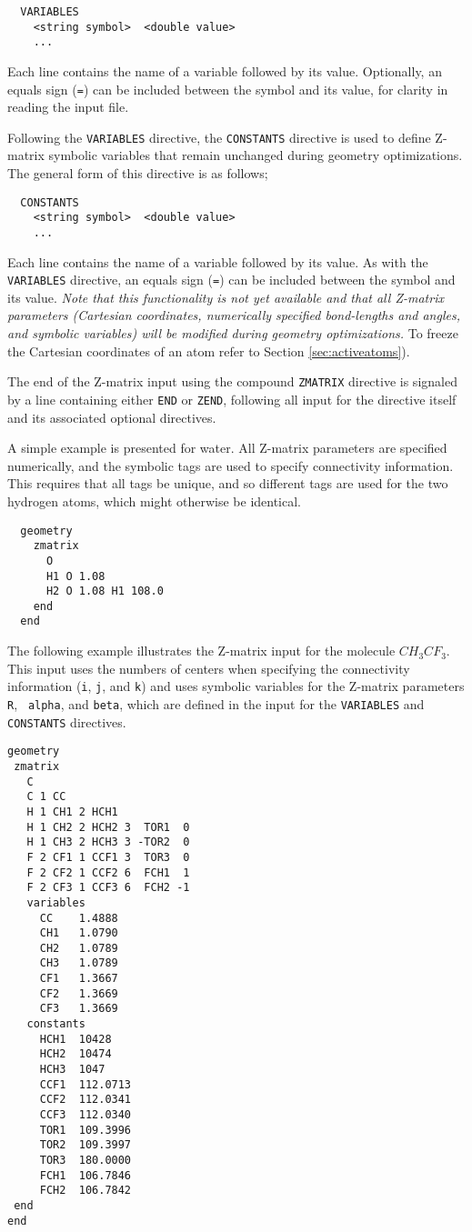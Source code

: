 \begin{verbatim}
  VARIABLES
    <string symbol>  <double value>
    ...
\end{verbatim}
Each line contains the name of a variable followed by its value.
Optionally, an equals sign (\verb+=+) can be included between the
symbol and its value, for clarity in reading the input file.

Following the \verb+VARIABLES+ directive, the \verb+CONSTANTS+
directive is used to define Z-matrix symbolic 
variables that remain unchanged during geometry optimizations.  The
general form of this directive is as follows;
\begin{verbatim}
  CONSTANTS
    <string symbol>  <double value>
    ...
\end{verbatim}
Each line contains the name of a variable followed by its value.
As with the \verb+VARIABLES+ directive, 
an equals sign (\verb+=+) can be included between the
symbol and its value.
{\em Note that this functionality is not yet available and that all
  Z-matrix parameters (Cartesian coordinates, numerically specified
  bond-lengths and angles, and symbolic variables) will be modified
  during geometry optimizations.}  To freeze the Cartesian coordinates
of an atom refer to Section \ref{sec:activeatoms}).

The end of the Z-matrix input using the compound \verb+ZMATRIX+
directive is signaled by a line containing either \verb+END+ or
\verb+ZEND+, following all input for the directive itself and its
associated optional directives.  

A simple example is presented for water.  All Z-matrix parameters are
specified numerically, and the symbolic tags are used to specify
connectivity information.  This requires that all tags be unique, and
so different tags are used for the two hydrogen atoms, which might 
otherwise be identical.
\begin{verbatim}
  geometry
    zmatrix 
      O
      H1 O 1.08
      H2 O 1.08 H1 108.0
    end
  end
\end{verbatim}

The following example illustrates the Z-matrix input for the molecule
$CH_3CF_3$.  This input uses the numbers of centers when specifying
the connectivity information (\verb+i+, \verb+j+, and \verb+k+) and
uses symbolic variables for the Z-matrix parameters {\tt R}, {\tt
  alpha}, and {\tt beta}, which are defined in the input for the
\verb+VARIABLES+ and
\verb+CONSTANTS+ directives.

\begin{verbatim}
geometry 
 zmatrix
   C 
   C 1 CC 
   H 1 CH1 2 HCH1 
   H 1 CH2 2 HCH2 3  TOR1  0 
   H 1 CH3 2 HCH3 3 -TOR2  0 
   F 2 CF1 1 CCF1 3  TOR3  0 
   F 2 CF2 1 CCF2 6  FCH1  1 
   F 2 CF3 1 CCF3 6  FCH2 -1
   variables
     CC    1.4888 
     CH1   1.0790 
     CH2   1.0789  
     CH3   1.0789  
     CF1   1.3667 
     CF2   1.3669 
     CF3   1.3669
   constants
     HCH1  10428 
     HCH2  10474 
     HCH3  1047 
     CCF1  112.0713 
     CCF2  112.0341 
     CCF3  112.0340 
     TOR1  109.3996 
     TOR2  109.3997 
     TOR3  180.0000 
     FCH1  106.7846 
     FCH2  106.7842
 end   
end
\end{verbatim}

